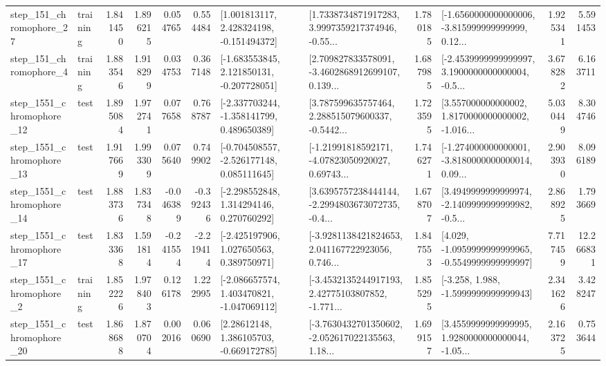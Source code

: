 \begin{tabular}{llrrrrllrlrr}
  step\_151\_chromophore\_27 &  training &      1.841450 &    1.896215 &      0.054765 &  0.554484 &    [1.001813117, 2.428324198, -0.151494372] &  [1.7338734871917283, 3.9997359217374946, -0.55... &       1.780185 &  [-1.6560000000000006, -3.815999999999999, 0.12... &            1.925341 &          5.591453 \\
   step\_151\_chromophore\_4 &  training &      1.883546 &    1.918299 &      0.034753 &  0.367148 &   [-1.683553845, 2.121850131, -0.207728051] &  [2.709827833578091, -3.4602868912699107, 0.139... &       1.687985 &  [-2.4539999999999997, 3.1900000000000004, -0.5... &            3.678282 &          6.163711 \\
 step\_1551\_chromophore\_12 &      test &      1.895084 &    1.972741 &      0.077658 &  0.768787 &   [-2.337703244, -1.358141799, 0.489650389] &  [3.787599635757464, 2.288515079600337, -0.5442... &       1.723595 &  [3.557000000000002, 1.8170000000000002, -1.016... &            5.030449 &          8.304746 \\
 step\_1551\_chromophore\_13 &      test &      1.917669 &    1.993309 &      0.075640 &  0.749902 &   [-0.704508557, -2.526177148, 0.085111645] &  [-1.21991818592171, -4.07823050920027, 0.69743... &       1.746271 &  [-1.274000000000001, -3.8180000000000014, 0.09... &            2.903930 &          8.096189 \\
 step\_1551\_chromophore\_14 &      test &      1.883736 &    1.837348 &     -0.046389 & -0.392436 &    [-2.298552848, 1.314294146, 0.270760292] &  [3.6395757238444144, -2.2994803673072735, -0.4... &       1.678707 &  [3.4949999999999974, -2.1409999999999982, -0.5... &            2.868925 &          1.793669 \\
 step\_1551\_chromophore\_17 &      test &      1.833368 &    1.591814 &     -0.241554 & -2.219414 &    [-2.425197906, 1.027650563, 0.389750971] &  [-3.9281138421824653, 2.041167722923056, 0.746... &       1.847553 &  [4.029, -1.0959999999999965, -0.5549999999999997] &            7.717459 &         12.266831 \\
  step\_1551\_chromophore\_2 &  training &      1.852226 &    1.978403 &      0.126178 &  1.222995 &   [-2.086657574, 1.403470821, -1.047069112] &  [-3.4532135244917193, 2.42775103807852, -1.771... &       1.855295 &               [-3.258, 1.988, -1.5999999999999943] &            2.341626 &          3.428247 \\
 step\_1551\_chromophore\_20 &      test &      1.868688 &    1.870704 &      0.002016 &  0.060690 &     [2.28612148, 1.386105703, -0.669172785] &  [-3.7630432701350602, -2.052617022135563, 1.18... &       1.699157 &  [3.4559999999999995, 1.9280000000000044, -1.05... &            2.163725 &          0.753644 \\

\end{tabular}

